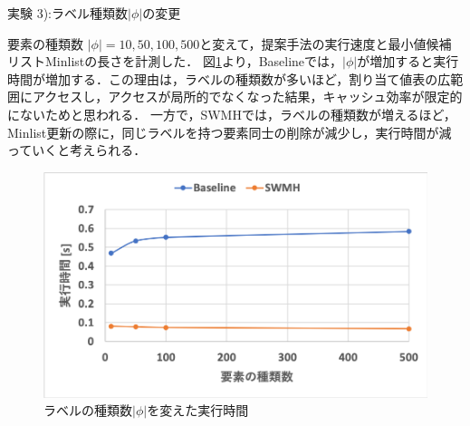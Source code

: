 \begin{table}[h]
 \caption{傾きと実行時間，Minlistの長さとの関係}
  \label{tab:jikken2}
 \centering
\end{table}


実験 3):ラベル種類数$|\phi|$の変更

要素の種類数 $| \phi | = 10,50,100,500$と変えて，提案手法の実行速度と最小値候補リストMinlistの長さを計測した．
図\ref{fig:jikken3}より，Baselineでは，$|\phi|$が増加すると実行時間が増加する．この理由は，ラベルの種類数が多いほど，割り当て値表の広範囲にアクセスし，アクセスが局所的でなくなった結果，キャッシュ効率が限定的にないためと思われる．
一方で，SWMHでは，ラベルの種類数が増えるほど，Minlist更新の際に，同じラベルを持つ要素同士の削除が減少し，実行時間が減っていくと考えられる．


  \begin{figure}[h]
  \centering
  \includegraphics[width=14cm]{jikken3.png}
    \caption{ラベルの種類数$|\phi|$を変えた実行時間}
    \label{fig:jikken3}
\end{figure}


